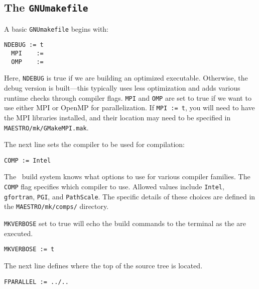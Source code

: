 \subsection{The {\tt GNUmakefile}}

\label{sec:makefile}

A basic {\tt GNUmakefile} begins with:
\begin{lstlisting}[language={[gnu]make},mathescape=false]
  NDEBUG := t
  MPI    :=
  OMP    :=
\end{lstlisting}
Here, {\tt NDEBUG} is true if we are building an optimized executable.
Otherwise, the debug version is built---this typically uses less
optimization and adds various runtime checks through compiler flags.
{\tt MPI} and {\tt OMP} are set to true if we want to use either MPI
or OpenMP for parallelization.  If {\tt MPI := t}, you will need to
have the MPI libraries installed, and their location may need to be 
specified in {\tt MAESTRO/mk/GMakeMPI.mak}.

The next line sets the compiler to be used for compilation:
\begin{lstlisting}[language={[gnu]make},mathescape=false]
  COMP := Intel
\end{lstlisting}
The \maestro\ build system knows what options to use for various
compiler families.  The {\tt COMP} flag specifies which compiler to
use.  Allowed values include {\tt Intel}, {\tt gfortran}, {\tt PGI},
and {\tt PathScale}.  The specific details of these choices are
defined in the {\tt MAESTRO/mk/comps/} directory.

{\tt MKVERBOSE} set to true will echo the build commands to the
terminal as the are executed.
\begin{lstlisting}[language={[gnu]make},mathescape=false]
  MKVERBOSE := t
\end{lstlisting}

The next line defines where the top of the source tree is located.
\begin{lstlisting}[language={[gnu]make},mathescape=false]
  FPARALLEL := ../..
\end{lstlisting}

